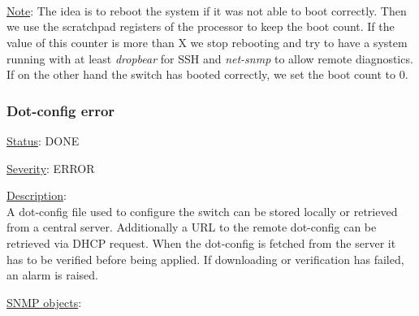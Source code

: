 \begin{pck_descr}
{				\\
				 \\
				\\
         }
			\item [] \underline{Note}: 
				The idea is to reboot the system if it was not able to boot correctly.
				Then we use the scratchpad registers of the processor to keep
				the boot count. If the value of this counter is more than X we stop
				rebooting and try to have a system running with at least \emph{dropbear}
				for SSH and \emph{net-snmp} to allow remote diagnostics. If on the other
				hand the switch has booted correctly, we set the boot count to 0.
		\end{pck_descr}

\subsubsection{\bf Dot-config error}
		\label{fail:other:dot-config}
		\begin{pck_descr}
			\item [] \underline{Status}: DONE
			\item [] \underline{Severity}: ERROR
			\item [] \underline{Description}:\\
				A dot-config file used to configure the switch can be stored locally or
				retrieved from a central server. Additionally a URL to the remote
        dot-config can be retrieved via DHCP request. When the dot-config is
        fetched from the server it has to be verified before being applied. If
        downloading or verification has failed, an alarm is raised.
			\item [] \underline{SNMP objects}:\\
        {\footnotesize
				 \\
				 \\
				 \\
				 \\
				\\
         }
		\end{pck_descr}

